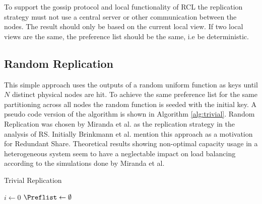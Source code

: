 To support the gossip protocol and local functionality of \ac{RCL} the replication strategy must not use a central server or other communication between the nodes.
The result should only be based on the current local view.
If two local views are the same, the preference list should be the same, i.e be deterministic.


\subsection{Random Replication}
This simple approach uses the outputs of a random uniform function as keys until $N$ distinct physical nodes are hit.
To achieve the same preference list for the same partitioning across all nodes the random function is seeded with the initial key.
A pseudo code  version of the algorithm is shown in Algorithm \ref{alg:trivial}.
Random Replication was chosen by Miranda et al. as the replication strategy in the analysis of \ac{RS}\cite{Miranda2014}.
Initially Brinkmann et al. mention this approach as a motivation for Redundant Share\cite{Brinkmann2007}.
Theoretical results showing non-optimal capacity usage in a heterogeneous system seem to have a neglectable impact on load balancing according to the simulations done by Miranda et al.

\begin{algorithm}
\caption{Trivial Replication}
\label{alg:trivial}
$i \leftarrow 0$\;
$\Preflist \leftarrow \emptyset$\;
\end{algorithm}


